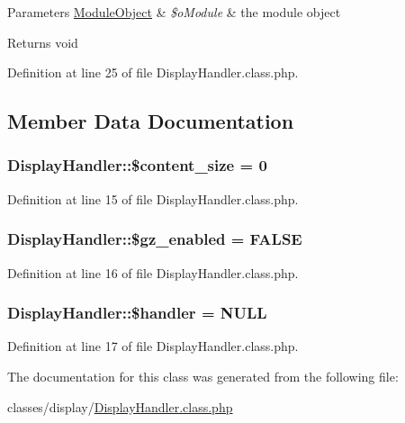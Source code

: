 \begin{DoxyParams}[1]{Parameters}
\hyperlink{classModuleObject}{Module\+Object} & {\em \$o\+Module} & the module object \\
\hline
\end{DoxyParams}
\begin{DoxyReturn}{Returns}
void 
\end{DoxyReturn}


Definition at line 25 of file Display\+Handler.\+class.\+php.



\subsection{Member Data Documentation}
\subsubsection[{\texorpdfstring{\$content\+\_\+size}{$content_size}}]{\setlength{\rightskip}{0pt plus 5cm}Display\+Handler\+::\$content\+\_\+size = 0}\hypertarget{classDisplayHandler_a16976f3c3f4d8e587c113278731a5562}{}\label{classDisplayHandler_a16976f3c3f4d8e587c113278731a5562}


Definition at line 15 of file Display\+Handler.\+class.\+php.

\subsubsection[{\texorpdfstring{\$gz\+\_\+enabled}{$gz_enabled}}]{\setlength{\rightskip}{0pt plus 5cm}Display\+Handler\+::\$gz\+\_\+enabled = F\+A\+L\+SE}\hypertarget{classDisplayHandler_a15d342938e38ae003b61d9437a43d3dc}{}\label{classDisplayHandler_a15d342938e38ae003b61d9437a43d3dc}


Definition at line 16 of file Display\+Handler.\+class.\+php.

\subsubsection[{\texorpdfstring{\$handler}{$handler}}]{\setlength{\rightskip}{0pt plus 5cm}Display\+Handler\+::\$handler = N\+U\+LL}\hypertarget{classDisplayHandler_a5bba2765a13e36d9e147424338fb2a92}{}\label{classDisplayHandler_a5bba2765a13e36d9e147424338fb2a92}


Definition at line 17 of file Display\+Handler.\+class.\+php.



The documentation for this class was generated from the following file\+:\begin{DoxyCompactItemize}
\item 
classes/display/\hyperlink{DisplayHandler_8class_8php}{Display\+Handler.\+class.\+php}\end{DoxyCompactItemize}

